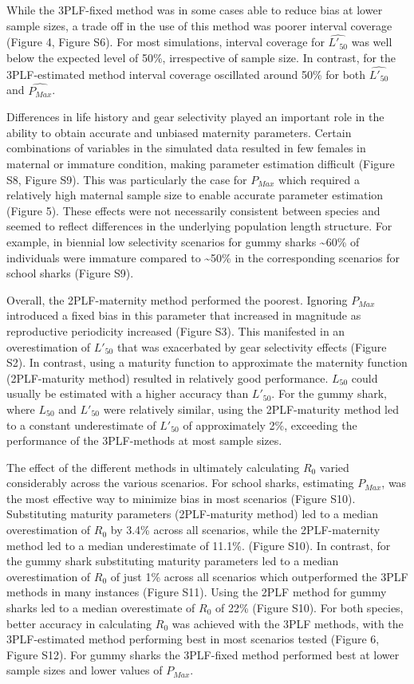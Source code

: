 \documentclass[
]{article}
\begin{document}
While the 3PLF-fixed method was in some cases able to reduce bias at lower sample sizes, a trade off in the use of this method was poorer interval coverage (Figure 4, Figure S6). For most simulations, interval coverage for \(\hat{L'_{50}}\) was well below the expected level of 50\%, irrespective of sample size. In contrast, for the 3PLF-estimated method interval coverage oscillated around 50\% for both \(\hat{L'_{50}}\) and \(\hat{P_{Max}}\).

Differences in life history and gear selectivity played an important role in the ability to obtain accurate and unbiased maternity parameters. Certain combinations of variables in the simulated data resulted in few females in maternal or immature condition, making parameter estimation difficult (Figure S8, Figure S9). This was particularly the case for \(P_{Max}\) which required a relatively high maternal sample size to enable accurate parameter estimation (Figure 5). These effects were not necessarily consistent between species and seemed to reflect differences in the underlying population length structure. For example, in biennial low selectivity scenarios for gummy sharks \textasciitilde60\% of individuals were immature compared to \textasciitilde50\% in the corresponding scenarios for school sharks (Figure S9).

Overall, the 2PLF-maternity method performed the poorest. Ignoring \(P_{Max}\) introduced a fixed bias in this parameter that increased in magnitude as reproductive periodicity increased (Figure S3). This manifested in an overestimation of \(L'_{50}\) that was exacerbated by gear selectivity effects (Figure S2). In contrast, using a maturity function to approximate the maternity function (2PLF-maturity method) resulted in relatively good performance. \(L_{50}\) could usually be estimated with a higher accuracy than \(L'_{50}\). For the gummy shark, where \(L_{50}\) and \(L'_{50}\) were relatively similar, using the 2PLF-maturity method led to a constant underestimate of \(L'_{50}\) of approximately 2\%, exceeding the performance of the 3PLF-methods at most sample sizes.

The effect of the different methods in ultimately calculating \(R_0\) varied considerably across the various scenarios. For school sharks, estimating \(P_{Max}\), was the most effective way to minimize bias in most scenarios (Figure S10). Substituting maturity parameters (2PLF-maturity method) led to a median overestimation of \(R_0\) by 3.4\% across all scenarios, while the 2PLF-maternity method led to a median underestimate of 11.1\%. (Figure S10). In contrast, for the gummy shark substituting maturity parameters led to a median overestimation of \(R_0\) of just 1\% across all scenarios which outperformed the 3PLF methods in many instances (Figure S11). Using the 2PLF method for gummy sharks led to a median overestimate of \(R_0\) of 22\% (Figure S10). For both species, better accuracy in calculating \(R_0\) was achieved with the 3PLF methods, with the 3PLF-estimated method performing best in most scenarios tested (Figure 6, Figure S12). For gummy sharks the 3PLF-fixed method performed best at lower sample sizes and lower values of \(P_{Max}\).
\end{document}
